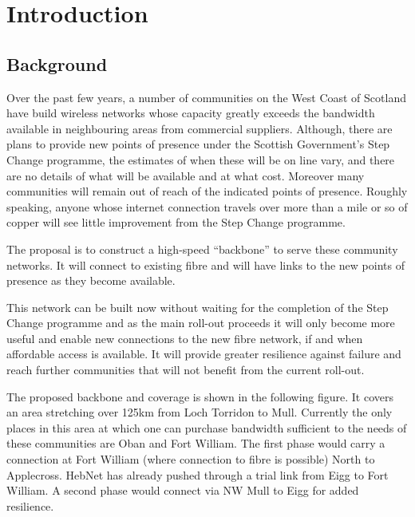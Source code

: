 \section{Introduction}

\subsection{Background}
Over the past few years, a number of communities on the West Coast of
Scotland have build wireless networks whose capacity greatly exceeds the 
bandwidth available in neighbouring areas from commercial suppliers.
Although, there are plans to provide new points of presence under the
Scottish Government's Step Change programme, the estimates of when
these will be on line vary, and there are no details of what will be
available and at what cost.  Moreover many communities will remain out
of reach of the indicated points of presence. Roughly speaking, anyone
whose internet connection travels over more than a mile or so of
copper will see little improvement from the Step Change programme.

The proposal is to construct a high-speed ``backbone'' to serve these
community networks. It will connect to existing fibre and will have
links to the new points of presence as they become available.

This network can be built now without waiting for the completion of the Step Change programme and as the main roll-out proceeds it will only become more useful and enable new connections to the new fibre network,  if and when affordable access is available.  It will provide greater resilience against failure and reach further communities that will not benefit from the current roll-out.

The proposed backbone and coverage is shown in the following figure.
It covers an area stretching over 125km from Loch Torridon to Mull.
Currently the only places in this area at which one can purchase
bandwidth sufficient to the needs of these communities are Oban and
Fort William.
The first phase would carry a  connection at Fort William (where
connection to fibre is possible) North to Applecross. HebNet has
already pushed through a trial link from Eigg to Fort William.  A
second phase would connect via NW Mull to Eigg for added resilience.  

